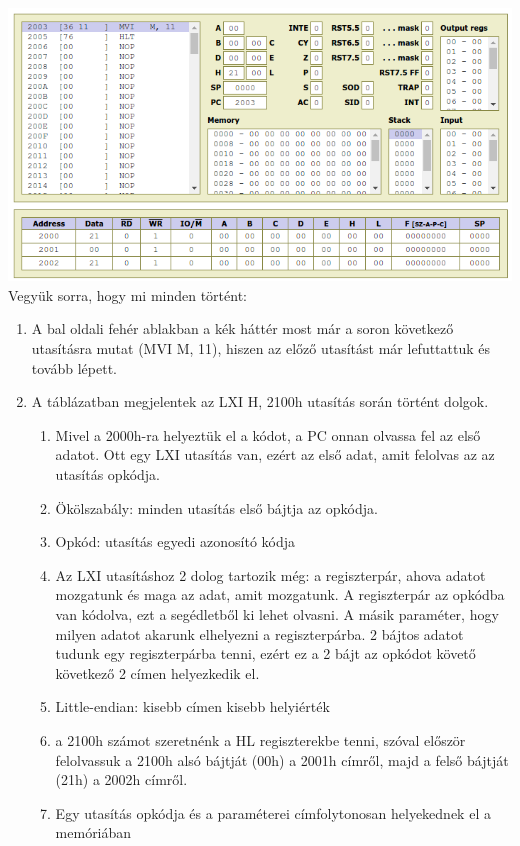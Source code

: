 \documentclass{article}
\begin{document}
\includegraphics[scale=0.5]{sim_lepes6.png} \\
Vegyük sorra, hogy mi minden történt:
\begin{enumerate}
	\item A bal oldali fehér ablakban a kék háttér most már a soron következő utasításra mutat (MVI   M, 11), hiszen az előző utasítást már lefuttattuk és tovább lépett.
	\item A táblázatban megjelentek az LXI H, 2100h utasítás során történt dolgok.
	\begin{enumerate}
		\item Mivel a 2000h-ra helyeztük el a kódot, a PC onnan olvassa fel az első adatot. Ott egy LXI utasítás van, ezért az első adat, amit felolvas az az utasítás opkódja.
		\item \colorbox{orange!30}{Ökölszabály: minden utasítás első bájtja az opkódja.}
		\item \colorbox{orange!30}{Opkód: utasítás egyedi azonosító kódja}
		\item Az LXI utasításhoz 2 dolog tartozik még: a regiszterpár, ahova adatot mozgatunk és maga az adat, amit mozgatunk. A regiszterpár az opkódba van kódolva, ezt a segédletből ki lehet olvasni. A másik paraméter, hogy milyen adatot akarunk elhelyezni a regiszterpárba. 2 bájtos adatot tudunk egy regiszterpárba tenni, ezért ez a 2 bájt az opkódot követő következő 2 címen helyezkedik el.
		\item \colorbox{orange!30}{Little-endian: kisebb címen kisebb helyiérték}
		\item a 2100h számot szeretnénk a HL regiszterekbe tenni, szóval először felolvassuk a 2100h alsó bájtját (00h) a 2001h címről, majd a felső bájtját (21h) a 2002h címről.
		\item \colorbox{orange!30}{Egy utasítás opkódja és a paraméterei címfolytonosan helyekednek el a memóriában}

\end{enumerate}
\end{enumerate}
\end{document}
